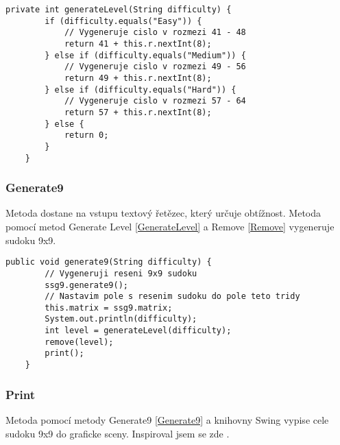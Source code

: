 \begin{small}
\begin{lstlisting}
private int generateLevel(String difficulty) {
        if (difficulty.equals("Easy")) {
            // Vygeneruje cislo v rozmezi 41 - 48
            return 41 + this.r.nextInt(8);
        } else if (difficulty.equals("Medium")) {
            // Vygeneruje cislo v rozmezi 49 - 56
            return 49 + this.r.nextInt(8);
        } else if (difficulty.equals("Hard")) {
            // Vygeneruje cislo v rozmezi 57 - 64
            return 57 + this.r.nextInt(8);
        } else {
            return 0;
        }
    }
\end{lstlisting}
\end{small}

\label{Generate9}\subsubsection{Generate9}
Metoda dostane na vstupu textový řetězec, který určuje obtížnost. Metoda pomocí metod Generate Level \ref{GenerateLevel} a Remove \ref{Remove} vygeneruje sudoku 9x9.

\begin{small}
\begin{lstlisting}
public void generate9(String difficulty) {
        // Vygeneruji reseni 9x9 sudoku
        ssg9.generate9();
        // Nastavim pole s resenim sudoku do pole teto tridy
        this.matrix = ssg9.matrix;
        System.out.println(difficulty);
        int level = generateLevel(difficulty);
        remove(level);
        print();
    }
\end{lstlisting}
\end{small}

\subsubsection{Print}
Metoda pomocí metody Generate9 \ref{Generate9} a knihovny Swing vypise cele sudoku 9x9 do graficke sceny. Inspiroval jsem se zde \cite{GUI}.

